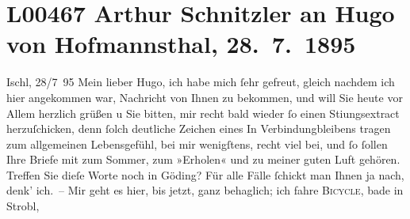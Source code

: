

\section[Arthur Schnitzler an Hugo von Hofmannsthal, 28. 7. 1895]{L00467 Arthur Schnitzler an Hugo von Hofmannsthal, 28. 7. 1895}
\nopagebreak{}
\rehead{ }\normalsize\beginnumbering{}
\toendnotes[C]{\smallbreak\pagebreak[2]}
\toendnotes[C]{\smallbreak}
\toendnotes[C]{\smallbreak}
\pstart
           \raggedleft{}{\pb}Ischl, 28/7 95\pend
           \vspace{0.5em}
\pstart
           Mein lieber Hugo, ich habe mich{ }ſehr gefreut, gleich nachdem ich
               hier angekommen war, Nachricht von Ihnen zu bekommen, und will Sie heute vor Allem
               herzlich grüßen u Sie bitten, mir recht bald wieder{ }ſo einen Sti{\geminationm}ungsextract herzuſchicken, denn{ }ſolch deutliche Zeichen
               eines In Verbindungbleibens tragen zum allgemeinen Lebensgefühl, bei mir wenigſtens,
               recht viel bei, und{ }ſo{ }ſollen {\pb}Ihre Briefe mit zum
               Sommer, zum »Erholen« und zu meiner guten Luft gehören. Treffen Sie dieſe Worte noch
               in Göding? Für alle Fälle{ }ſchickt man Ihnen ja
               nach, denk’ ich. – Mir geht es hier, bis jetzt, ganz behaglich; ich fahre \textsc{Bicycle}, bade in Strobl,
